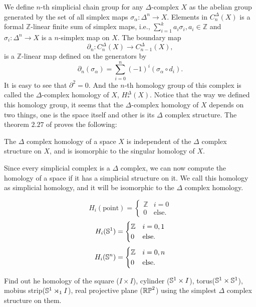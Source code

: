 We define \(n\)-th simplicial chain group for any \(\Delta\)-complex \(X\) as the abelian group generated by the set of all simplex maps \( \sigma_\alpha: \Delta^n \to X\).
Elements in \(C^\Delta_n(X)\) is a formal \(\mathbb Z\)-linear finite sum of simplex maps, i.e., \(\displaystyle \sum_{i=1}^k a_i\sigma_i, a_i \in \mathbb Z\) and \(\sigma_i:\Delta^n \to X\) is a \(n\)-simplex map on \(X\).
The boundary map \[\partial_n:C^\Delta_n(X) \to C^\Delta_{n-1}(X),\] is a \(\mathbb Z\)-linear map defined on the generators by 
\[\partial_n(\sigma_\alpha) = \sum_{i=0}^n (-1)^i (\sigma_\alpha \circ d_i).\]
It is easy to see that \(\partial^2=0\).
And the \(n\)-th homology group of this complex is called the \(\Delta\)-complex homology of \(X\), \(H^\Delta_\ast(X)\).
Notice that the way we defined this homology group, it seems that the \(\Delta\)-complex homology of \(X\) depends on two things, one is the space itself and other is its \(\Delta\) complex structure.
The theorem \(2.27\) of \cite{Hatcher2002} proves the following:
\begin{theorem}
	The \(\Delta\) complex homology of a space \(X\) is independent of the \(\Delta\) complex structure on \(X\), and is isomorphic to the singular homology of \(X\).
\end{theorem}

Since every simplicial complex is a \(\Delta\) complex, we can now compute the homology of a space if it has a simplicial structure on it.
We call this homology as simplicial homology, and it will be isomorphic to the \(\Delta\) complex homology.

\begin{example}
	\[H_i(\text{point}) = \begin{cases}
		\mathbb Z & i = 0\\
		0 & \text{else.}
	\end{cases}\]
	\[H_i(\mathbb{S}^{1}) = \begin{cases}
		\mathbb Z & i = 0,1\\
		0 & \text{else.}
	\end{cases}\]
	\[H_i(\mathbb{S}^{n}) = \begin{cases}
		\mathbb Z & i = 0,n\\
		0 & \text{else.}
	\end{cases}\]
\end{example}

\begin{exercise}
	Find out he homology of the square (\(I \times I\)), cylinder (\(\mathbb{S}^{1} \times I\)), torus(\(\mathbb{S}^{1} \times \mathbb{S}^{1}\)), mobius strip(\(\mathbb{S}^{1} \rtimes_1 I\)), real projective plane (\(\mathbb{RP}^{2}\)) using the simplest \(\Delta\) complex structure on them.
\end{exercise}

